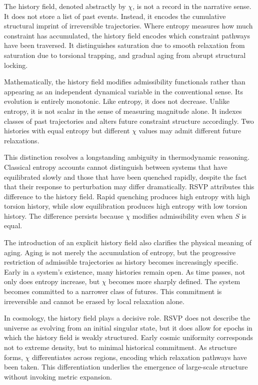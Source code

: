 \documentclass[11pt,oneside]{book}
\begin{document}
The history field, denoted abstractly by $\chi$, is not a record in the narrative sense. It does not store a list of past events. Instead, it encodes the cumulative structural imprint of irreversible trajectories. Where entropy measures how much constraint has accumulated, the history field encodes which constraint pathways have been traversed. It distinguishes saturation due to smooth relaxation from saturation due to torsional trapping, and gradual aging from abrupt structural locking.

Mathematically, the history field modifies admissibility functionals rather than appearing as an independent dynamical variable in the conventional sense. Its evolution is entirely monotonic. Like entropy, it does not decrease. Unlike entropy, it is not scalar in the sense of measuring magnitude alone. It indexes classes of past trajectories and alters future constraint structure accordingly. Two histories with equal entropy but different $\chi$ values may admit different future relaxations.

This distinction resolves a longstanding ambiguity in thermodynamic reasoning. Classical entropy accounts cannot distinguish between systems that have equilibrated slowly and those that have been quenched rapidly, despite the fact that their response to perturbation may differ dramatically. RSVP attributes this difference to the history field. Rapid quenching produces high entropy with high torsion history, while slow equilibration produces high entropy with low torsion history. The difference persists because $\chi$ modifies admissibility even when $S$ is equal.

The introduction of an explicit history field also clarifies the physical meaning of aging. Aging is not merely the accumulation of entropy, but the progressive restriction of admissible trajectories as history becomes increasingly specific. Early in a system’s existence, many histories remain open. As time passes, not only does entropy increase, but $\chi$ becomes more sharply defined. The system becomes committed to a narrower class of futures. This commitment is irreversible and cannot be erased by local relaxation alone.

In cosmology, the history field plays a decisive role. RSVP does not describe the universe as evolving from an initial singular state, but it does allow for epochs in which the history field is weakly structured. Early cosmic uniformity corresponds not to extreme density, but to minimal historical commitment. As structure forms, $\chi$ differentiates across regions, encoding which relaxation pathways have been taken. This differentiation underlies the emergence of large-scale structure without invoking metric expansion.
\end{document}
